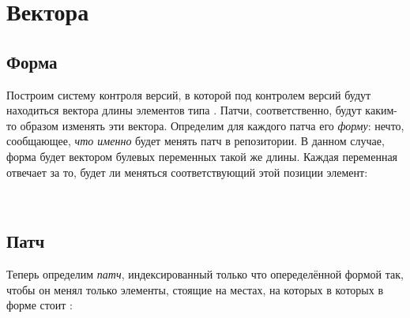 

\section{Вектора}

\subsection{Форма}

Построим систему контроля версий, в которой под контролем версий будут
находиться вектора длины  элементов типа .
Патчи, соответственно, будут каким-то образом изменять эти вектора.
Определим для каждого патча его \emph{форму}: нечто, сообщающее,
\emph{что именно} будет менять патч в репозитории. В данном случае,
форма будет вектором булевых переменных такой же длины. Каждая
переменная отвечает за то, будет ли меняться соответствующий этой
позиции элемент:

\begin{code}%
\>[0]\<[2]%
\>[2] \AgdaSymbol{:}   \<%
\\
\>[0]\<[2]%
\>[2] \AgdaSymbol{=}   \<%
\end{code}

\subsection{Патч}

Теперь определим \emph{патч}, индексированный только что опеределённой
формой так, чтобы он менял только элементы, стоящие на местах, на
которых в которых в форме стоит :


